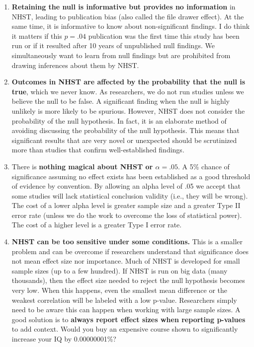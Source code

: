 \documentclass[
]{book}
\begin{document}
\begin{enumerate}
\def\labelenumi{\arabic{enumi}.}
\item
  \textbf{Retaining the null is informative but provides no information} in NHST, leading to publication bias (also called the file drawer effect). At the same time, it is informative to know about non-significant findings. I do think it matters if this \(p = .04\) publication was the first time this study has been run or if it resulted after 10 years of unpublished null findings. We simultaneously want to learn from null findings but are prohibited from drawing inferences about them by NHST.
\item
  \textbf{Outcomes in NHST are affected by the probability that the null is true}, which we never know. As researchers, we do not run studies unless we believe the null to be false. A significant finding when the null is highly unlikely is more likely to be spurious. However, NHST does not consider the probability of the null hypothesis. In fact, it is an elaborate method of avoiding discussing the probability of the null hypothesis. This means that significant results that are very novel or unexpected should be scrutinized more than studies that confirm well-established findings.
\item
  There is \textbf{nothing magical about NHST or \(\alpha = .05\)}. A 5\% chance of significance assuming no effect exists has been established as a good threshold of evidence by convention. By allowing an alpha level of .05 we accept that some studies will lack statistical conclusion validity (i.e., they will be wrong). The cost of a lower alpha level is greater sample size and a greater Type II error rate (unless we do the work to overcome the loss of statistical power). The cost of a higher level is a greater Type I error rate.
\item
  \textbf{NHST can be too sensitive under some conditions.} This is a smaller problem and can be overcome if researchers understand that significance does not mean effect size nor importance. Much of NHST is developed for small sample sizes (up to a few hundred). If NHST is run on big data (many thousands), then the effect size needed to reject the null hypothesis becomes very low. When this happens, even the smallest mean difference or the weakest correlation will be labeled with a low p-value. Researchers simply need to be aware this can happen when working with large sample sizes. A good solution is to \textbf{always report effect sizes when reporting p-values} to add context. Would you buy an expensive course shown to significantly increase your IQ by 0.00000001\%?
\end{enumerate}
\end{document}
